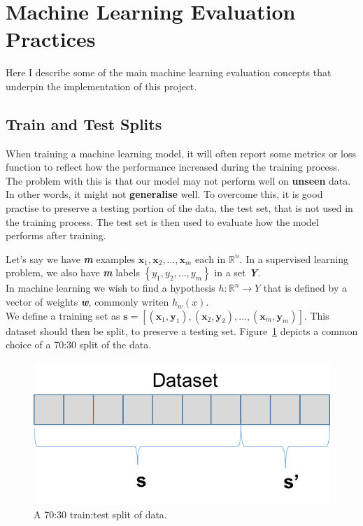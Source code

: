 \documentclass[12pt,a4paper,twoside]{report}
\begin{document}
\section{Machine Learning Evaluation Practices}
Here I describe some of the main machine learning evaluation concepts that underpin the implementation of this project. 

\subsection{Train and Test Splits}

When training a machine learning model, it will often report some metrics or loss function to reflect how the performance increased during the training process. The problem with this is that our model may not perform well on \textbf{unseen} data. In other words, it might not \textbf{generalise} well. To overcome this, it is good practise to preserve a testing portion of the data, the test set, that is not used in the training process. The test set is then used to evaluate how the model performs after training. 

Let's say we have \textbf{\textit{m}} examples $ \mathbf { x } _ { 1} ,\mathbf { x } _ { 2} ,\dots ,\mathbf { x } _ { m }$ each in $\mathbb { R } ^ { n }$. In a supervised learning problem, we also have \textbf{\textit{m}} labels $\left\{ y _ { 1} ,y _ { 2} ,\dots ,y _ { m } \right\}$ in a set \textbf{\textit{Y}}.\\
In machine learning we wish to find a hypothesis $h : \mathbb { R } ^ { n } \rightarrow Y$ that is defined by a vector of weights \textbf{\textit{w}}, commonly writen $h _ { w } ( x )$.\\

We define a training set as $\mathbf{s} = [(\mathbf { x } _ { 1}, \mathbf { y } _ { 1}),(\mathbf { x } _ { 2}, \mathbf { y } _ { 2}),\dots,(\mathbf { x } _ { m}, \mathbf { y } _ { m})]$. This dataset should then be split, to preserve a testing set. Figure~\ref{fig:70-30-split} depicts a common choice of a 70:30 split of the data.
 
\begin{figure}[!htbp]

\centering
\includegraphics[scale=0.8]{train-test-split}
\caption{A 70:30 train:test split of data.}
\label{fig:70-30-split}
\end{figure}
\end{document}
